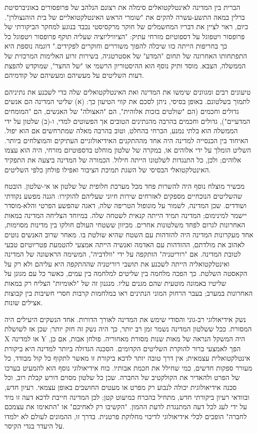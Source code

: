 \documentclass[12pt,oneside]{book}
\begin{document}
הברית בין המדינה לאינטלקטואלים סימלה את רצונם הנלהב של פרופסורים באוניברסיטת ברלין במאה התשע-עשרה להקים את "שומרי הראש האינטלקטואליים של בית הוהנצולרן". כיום, ראוי לציין את דבריו המחשמלים של חוקר מרקסיסטי נכבד בנוגע למחקר הביקורתי של פרופסור ויטפוגל על דספוטיזם מזרחי עתיק: "הציוויליזציה שעליה תוקף פרופסור ויטפוגל כל כך בחריפות הייתה כזו שיכלה להפוך משוררים וחוקרים לפקידים." דוגמה נוספת היא התפתחותו האחרונה של תחום "המדע" של אסטרטגיה, בשירות זרוע האלימות המרכזית של הממשלה, הצבא. מוסד ותיק נוסף הוא ההיסטוריון הרשמי או "של החצר", שמוקדש להפצת דעות השליטים על מעשיהם ומעשיהם של קודמיהם.

טיעונים רבים ומגוונים שימשו את המדינה ואת האינטלקטואלים שלה כדי לשכנע את נתיניהם לתמוך בשלטונם. באופן בסיסי, ניתן לסכם את קווי הטיעון כך: (א) שליטי המדינה הם אנשים גדולים וחכמים (הם "שולטים בזכות אלוהית", הם "האצולה" של האנשים, הם "המומחים המדעיים"), גדולים וחכמים בהרבה מהנתינים הטובים אך הפשוטים למדי, ו-(ב) שלטון על ידי הממשלה הוא בלתי נמנע, הכרחי בהחלט, וטוב בהרבה מאלה שמתרחשים אם הוא יפול. האיחוד בין הכנסייה למדינה היה אחד מההתקנים האידיאולוגיים העתיקים והמוצלחים ביותר. השליט הומלך על ידי אלוהים או, במקרה של שלטון מוחלט בדספוטיזם מזרחי, היה הוא עצמו אלוהים; ולכן, כל התנגדות לשלטונו הייתה חילול. הכמורה של המדינה ביצעה את התפקיד האינטלקטואלי הבסיסי של השגת תמיכת הציבור ואפילו פולחן כלפי השליטים.

מכשיר מוצלח נוסף היה להשרות פחד מכל מערכת חלופית של שלטון או אי-שלטון. הובטח שהשליטים הנוכחיים מספקים לאזרחים שירות חיוני שעליהם להוקירו: הגנה מפשע נקודתי ושודדים. שכן המדינה, לשמור על מונופול הטריפה שלה, דאגה שהפשע הפרטי והלא-מוסדר יישמר למינימום; המדינה תמיד הייתה קנאית לשטחה שלה. במיוחד הצליחה המדינה במאות האחרונות לגרום לפחד משלטונות אחרים. מכיוון ששטחי העולם חולקו בין מדינות מסוימות, אחד מעקרונות המדינה היה להזדהות עם השטח שהיא שולטת בו. מאחר שרוב האנשים נוטים לאהוב את מולדתם, ההזדהות עם האדמה ואנשיה הייתה אמצעי להטמעת פטריוטיזם טבעי לטובת המדינה. אם "רוריטניה" הותקפה על ידי "וולדביה", המשימה הראשונה של המדינה ואינטלקטואליה הייתה לשכנע את תושבי רוריטניה שההתקפה היא עליהם ולא רק על הקאסטה השלטת. כך הפכה מלחמה בין שליטים למלחמה בין עמים, כאשר כל עם מגונן על שליטיו באמונה מוטעית שהם מגנים עליו. מנגנון זה של "לאומיות" הצליח רק במאות האחרונות במערב; בעבר הרחוק המוני הנתינים ראו במלחמות קרבות חסרי חשיבות בין קבוצות אצילים שונות.

נשק אידיאולוגי רב-גוני והסודי שימש את המדינה לאורך הדורות. אחד הנשקים היעילים היה המסורת. ככל ששלטון המדינה נשמר זמן רב יותר, כך היה נשק זה חזק יותר; שכן אז לשושלת X או למדינה Y היה המשקל הנראה של מאות שנות מסורת מאחוריה. פולחן אבות, אם כן, הפך לאמצעי ברור להוקרת השליטים הקדומים. הסכנה הגדולה ביותר למדינה היא ביקורת אינטלקטואלית עצמאית; אין דרך טובה יותר לדכא ביקורת זו מאשר לתקוף כל קול מבודד, כל מעורר ספקות חדשים, כמי שחילל את חכמת אבותיו. כוח אידיאולוגי נוסף הוא להמעיט בערכו של הפרט ולהאדיר את הקולקטיב של החברה. שכן כל שלטון מסוים דורש קבלת רוב, וכל סכנה אידיאולוגית יכולה לנבוע רק מפרט או מעטים החושבים באופן עצמאי. רעיון חדש, ובוודאי רעיון ביקורתי חדש, מתחיל בהכרח כמיעוט קטן; לכן המדינה חייבת לדכא דעה זו מיד על ידי לעג לכל דעה המתנגדת לדעת ההמון. "הקשיבו רק לאחיכם" או "התאימו את עצמכם לחברה" הופכים לכלי אידיאולוגי לדיכוי מחלוקת פרטנית. בדרך זו, ההמונים לעולם לא ילמדו על היעדר בגדי הקיסר.
\end{document}
